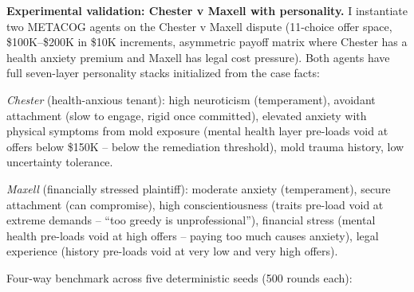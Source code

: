 \documentclass[
  11pt,
]{article}
\begin{document}
\textbf{Experimental validation: Chester v Maxell with personality.} I
instantiate two METACOG agents on the Chester v Maxell dispute
(11-choice offer space, \$100K--\$200K in \$10K increments, asymmetric
payoff matrix where Chester has a health anxiety premium and Maxell has
legal cost pressure). Both agents have full seven-layer personality
stacks initialized from the case facts:

\emph{Chester} (health-anxious tenant): high neuroticism (temperament),
avoidant attachment (slow to engage, rigid once committed), elevated
anxiety with physical symptoms from mold exposure (mental health layer
pre-loads void at offers below \$150K -- below the remediation
threshold), mold trauma history, low uncertainty tolerance.

\emph{Maxell} (financially stressed plaintiff): moderate anxiety
(temperament), secure attachment (can compromise), high
conscientiousness (traits pre-load void at extreme demands -- ``too
greedy is unprofessional''), financial stress (mental health pre-loads
void at high offers -- paying too much causes anxiety), legal experience
(history pre-loads void at very low and very high offers).

Four-way benchmark across five deterministic seeds (500 rounds each):
\end{document}
